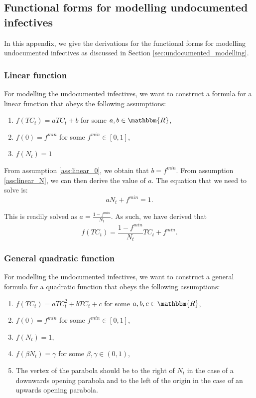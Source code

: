 \documentclass[12pt]{article}
\newcommand{\R}{\mathbbm{R}}
\begin{document}
\begin{appendices}
		\subsection{Functional forms for modelling undocumented infectives}\label{sapp:derivation_undocumented_infectives}
		In this appendix, we give the derivations for the functional forms for modelling undocumented infectives as discussed in Section \ref{sec:undocumented_modelling}.
		
		\subsubsection{Linear function} \label{ssapp:linear_derivation}
		For modelling the undocumented infectives, we want to construct a formula for a linear function that obeys the following assumptions:
		\begin{enumerate}[label=(\Roman*)]
		    \item\label{ass:linear_formula} $f(TC_t) = aTC_t + b$  for some $a, b \in \R$,
		    \item\label{ass:linear_0} $f(0) = f^{min}$ for some $f^{min} \in [0,1]$,
		    \item\label{ass:linear_N} $f(N_t) = 1$
		\end{enumerate}
		
		From assumption \ref{ass:linear_0}, we obtain that $b = f^{min}$. From assumption \ref{ass:linear_N}, we can then derive the value of $a$. The equation that we need to solve is:
		    \[aN_t + f^{min} = 1.\]
		    
		This is readily solved as $a = \frac{1-f^{min}}{N_t}$. As such, we have derived that
		    \[f(TC_t) = \frac{1-f^{min}}{N_t}TC_t + f^{min}.\]
		
		\subsubsection{General quadratic function} \label{ssapp:quadratic_derivation}
		For modelling the undocumented infectives, we want to construct a general formula for a quadratic function that obeys the following assumptions:
		\begin{enumerate}[label=(\Roman*)]
		    \item\label{ass:parabola_formula} $f(TC_t) = aTC_t^2 + bTC_t + c$ for some $a, b, c \in \R$,
		    \item\label{ass:parabola_0} $f(0) = f^{min}$ for some $f^{min} \in [0,1]$,
		    \item\label{ass:parabola_N} $f(N_t) = 1$,
		    \item\label{ass:parabola_betaN} $f(\beta N_t) = \gamma$ for some $\beta, \gamma \in (0,1)$,
		    \item\label{ass:parabola_vertex} The vertex of the parabola should be to the right of $N_t$ in the case of a downwards opening parabola and to the left of the origin in the case of an upwards opening parabola.
		\end{enumerate}
		

\end{appendices}
\end{document}
